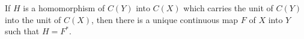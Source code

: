 If $H$ is a homomorphism of $C(Y)$ into $C(X)$ which carries the unit of $C(Y)$ into the unit of $C(X)$, then there is a unique continuous map $F$ of $X$ into $Y$ such that $H = F^*$.
